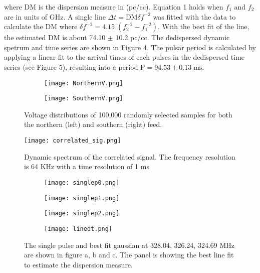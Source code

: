 \documentclass[12pt]{article}
\begin{document}
\begin{multicols}{2}
where DM is the dispersion measure in (pc/cc). Equation 1 holds when $f_1$ and $f_2$ are in units of GHz. A single line $\Delta t = \mbox{DM}\delta f^{-2}$   was fitted with the data to calculate the DM where $\delta f^{-2}= 4.15 \;(f_2^{-2} - f_1^{-2})$. With the best fit of the line, the estimated DM is about 74.10 $\pm$ 10.2 pc/cc. The dedispersed dynamic spetrum and time series are shown in Figure 4. The pulsar period is calculated by applying a linear fit to the arrival times of each pulses in the dedispersed time series (see Figure 5), resulting into a period $\mbox{P} = 94.53 \pm 0.13 \; \mbox{ms}$. 
     
\end{multicols}

\newpage
\vspace{0.2in}
\begin{figure}[h]
  \centering
  \begin{subfigure}[b]{0.49\textwidth}
  	\centering
    \texttt{[image: NorthernV.png]}
    \label{fig:vnorth}
  \end{subfigure}
  \begin{subfigure}[b]{0.49\textwidth}
  	\centering
    \texttt{[image: SouthernV.png]}
    \label{fig:vsouth}
  \end{subfigure}
  \label{fig:voltage}
  \caption{Voltage distributions of 100,000 randomly selected samples for both the northern (left) and southern (right) feed.}
\end{figure}

\begin{figure}[ht]
    \texttt{[image: correlated\_sig.png]} 
  	\label{fig:dscorr}  
  	\caption{Dynamic spectrum of the correlated signal. The frequency resolution is 64 KHz with a time resolution of 1 ms}
\end{figure}

\newpage
\begin{figure}
\centering
  \begin{subfigure}[h]{0.49\textwidth}
  	\centering
    \texttt{[image: singlep0.png]}
    \caption{}
  \end{subfigure}
  \begin{subfigure}[h]{0.49\textwidth}
  	\centering
    \texttt{[image: singlep1.png]}
    \caption{}
  \end{subfigure}
   \begin{subfigure}[h]{0.49\textwidth}
  	\centering
    \texttt{[image: singlep2.png]}
    \caption{}
  \end{subfigure}
   \begin{subfigure}[h]{0.49\textwidth}
  	\centering
    \texttt{[image: linedt.png]} 
    \caption{}
  \end{subfigure}
  \caption{The single pulse and best fit gaussian at 328.04, 326.24, 324.69 MHz are shown in figure a, b and c. The panel is showing the best line fit to estimate the dispersion measure.}
\end{figure}
\end{document}
